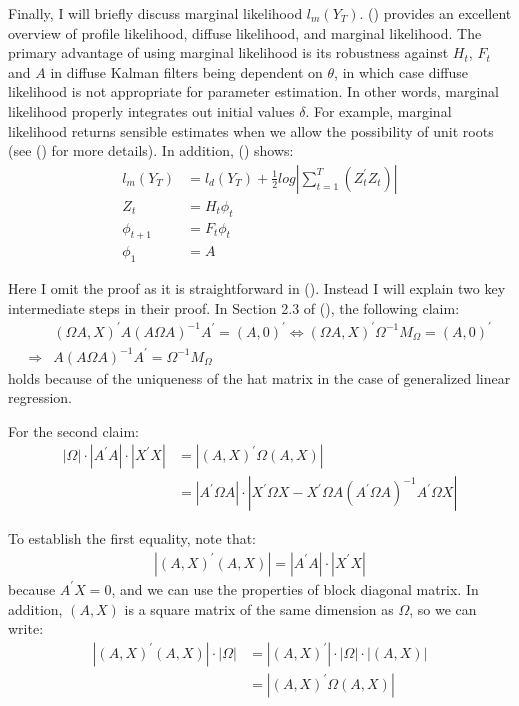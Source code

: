 \documentclass[10pt, titlepage]{article}
\numberwithin{equation}{section}
\begin{document}
Finally, I will briefly discuss marginal likelihood $l_m(Y_T)$. (\cite{francke2010likelihood}) provides an excellent overview of profile likelihood, diffuse likelihood, and marginal likelihood. The primary advantage of using marginal likelihood is its robustness against $H_t$, $F_t$ and $A$ in diffuse Kalman filters being dependent on $\theta$, in which case diffuse likelihood is not appropriate for parameter estimation. In other words, marginal likelihood properly integrates out initial values $\delta$. For example, marginal likelihood returns sensible estimates when we allow the possibility of unit roots (see (\cite{francke2007marginal}) for more details). In addition, (\cite{francke2010likelihood}) shows:
\begin{align*}
    l_m(Y_T) &= l_d(Y_T) + \frac{1}{2}log\left| \sum_{t=1}^{T}(Z_t^{'}Z_t) \right| \\
    Z_t &= H_t\phi_t \\
    \phi_{t+1} &= F_t\phi_t \\
    \phi_1 &= A
\end{align*}

Here I omit the proof as it is straightforward in (\cite{francke2010likelihood}). Instead I will explain two key intermediate steps in their proof. In Section 2.3 of (\cite{francke2010likelihood}), the following claim:
\begin{align*}
    &(\Omega A,X)^{'}A(A\Omega A)^{-1}A^{'}=(A,0)^{'} \Leftrightarrow (\Omega A,X)^{'}\Omega^{-1}M_{\Omega} = (A,0)^{'} \\
    \Rightarrow&A(A\Omega A)^{-1}A^{'}=\Omega^{-1}M_{\Omega}
\end{align*}
holds because of the uniqueness of the hat matrix in the case of generalized linear regression. 

For the second claim:
\begin{align*}
    |\Omega|\cdot|A^{'}A|\cdot|X^{'}X| &= |(A,X)^{'}\Omega(A,X)| \\
    &=|A^{'}\Omega A|\cdot|X^{'}\Omega X - X^{'}\Omega A(A^{'}\Omega A)^{-1}A^{'}\Omega X|
\end{align*}

To establish the first equality, note that:
\begin{align*}
    |(A,X)^{'}(A,X)| = |A^{'}A|\cdot|X^{'}X|
\end{align*}
because $A^{'}X=0$, and we can use the properties of block diagonal matrix. In addition, $(A,X)$ is a square matrix of the same dimension as $\Omega$, so we can write:
\begin{align*}
    |(A,X)^{'}(A,X)|\cdot|\Omega| &= |(A,X)^{'}|\cdot|\Omega|\cdot|(A,X)| \\
    &=|(A,X)^{'}\Omega(A,X)|
\end{align*}
\end{document}

